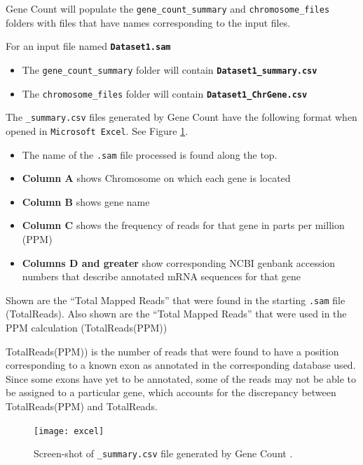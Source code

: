 \documentclass[11pt,fleqn]{book} %
\newcommand{\GeneCount}{{\color{Red} Gene Count }}
\begin{document}
\GeneCount will populate the \texttt{gene\_count\_summary} and \texttt{chromosome\_files} folders with files that have names corresponding to the input files. 

For an input file named \textbf{\texttt{Dataset1.sam}}
\begin{itemize}
	\item The \texttt{gene\_count\_summary} folder will contain \textbf{\texttt{Dataset1\_summary.csv}}
	\item The \texttt{chromosome\_files} folder will contain \textbf{\texttt{Dataset1\_ChrGene.csv}}
\end{itemize}

\vspace{15pt}
The \texttt{\_summary.csv} files generated by \GeneCount have the following format when opened in \texttt{Microsoft Excel}. See Figure \ref{fig:excel_screen_shot}.

\begin{itemize}
	\item The name of the \texttt{.sam} file processed is found along the top.
	\item \textbf{Column A} shows Chromosome on which each gene is located
	\item \textbf{Column B} shows gene name
	\item \textbf{Column C} shows the frequency of reads for that gene in parts per million (PPM)
	\item \textbf{Columns D and greater} show corresponding NCBI genbank accession numbers that describe annotated mRNA sequences for that gene
\end{itemize}

Shown are the ``Total Mapped Reads'' that were found in the starting \texttt{.sam} file (TotalReads). Also shown are the ``Total Mapped Reads'' that were used in the PPM calculation (TotalReads(PPM))

\begin{remark}
TotalReads(PPM)) is the number of reads that were found to have a position corresponding to a known exon as annotated in the corresponding database used. Since some exons have yet to be annotated, some of the reads may not be able to be assigned to a particular gene, which accounts for the discrepancy between TotalReads(PPM) and TotalReads.
\end{remark}



\begin{figure}[!ht]
    \centering
    \texttt{[image: excel]}
    \caption{Screen-shot of \texttt{\_summary.csv} file generated by \GeneCount.}
    \label{fig:excel_screen_shot}
\end{figure}
\end{document}
